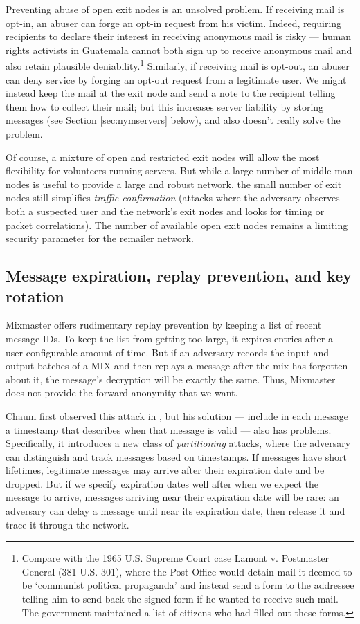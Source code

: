 \documentclass{llncs}
\begin{document}
Preventing abuse of open exit nodes is an unsolved problem. If
receiving mail is opt-in, an abuser can forge an opt-in request from
his victim. Indeed, requiring recipients to declare their interest
in receiving anonymous mail is risky --- human rights activists in
Guatemala cannot both sign up to receive anonymous mail and also retain
plausible deniability.\footnote{
  Compare with the 1965 U.S. Supreme Court case Lamont v. Postmaster
  General (381 U.S. 301), where the Post Office would detain mail it
  deemed to be `communist political propaganda' and instead send a form
  to the addressee telling him to send back the signed form if he wanted
  to receive such mail. The government maintained a list of citizens
  who had filled out these forms.
} Similarly, if receiving mail is opt-out, an abuser can deny service
by forging an opt-out request from a legitimate user. We might instead
keep the mail at the exit node and send a note to the recipient
telling them how to collect their mail; but this increases
server liability by storing messages (see Section \ref{sec:nymservers}
below), and also doesn't really solve the problem.

Of course, a mixture of open and restricted exit nodes will allow the
most flexibility for volunteers running servers. But while a large number
of middle-man nodes is useful to provide a large and robust network, the
small number of exit nodes still simplifies \emph{traffic confirmation}
(attacks where the adversary observes both a suspected user and the
network's exit nodes and looks for timing or packet correlations). The
number of available open exit nodes remains a limiting security parameter
for the remailer network.

\subsection{Message expiration, replay prevention, and key rotation}

Mixmaster offers rudimentary replay prevention by keeping a list of recent
message IDs. To keep the list from getting too large, it expires entries
after a user-configurable amount of time. But if an adversary records
the input and output batches of a MIX and then replays a message after
the mix has forgotten about it, the message's decryption will be exactly
the same. Thus, Mixmaster does not provide the forward anonymity that we want.

Chaum first observed this attack in \cite{chaum-mix}, but his solution
--- include in each message a timestamp that describes when that message
is valid --- also has problems. Specifically, it introduces a new class
of \emph{partitioning} attacks, where the adversary can distinguish and
track messages based on timestamps. If messages have short lifetimes,
legitimate messages may arrive after their expiration date and be
dropped. But if we specify expiration dates well after when we expect the
message to arrive, messages arriving near their expiration date will be
rare: an adversary can delay a message until near its expiration date,
then release it and trace it through the network.
\end{document}

